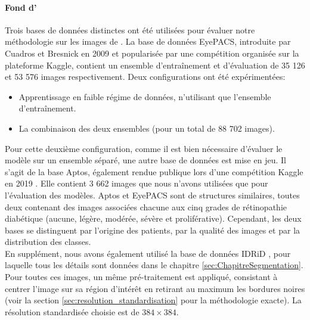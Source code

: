 \paragraph{Fond d'\oeil} Trois bases de données distinctes ont été utilisées pour évaluer notre méthodologie sur les images de \fundus. La base de données EyePACS, introduite par Cuadros et Bresnick en 2009 \cite{cuadros_bresnick_2009} et popularisée par une compétition organisée sur la plateforme Kaggle, contient un ensemble d'entraînement et d'évaluation de 35 126 et 53 576 images respectivement. Deux configurations ont été expérimentées: 
\begin{itemize}
	\item Apprentissage en faible régime de données, n'utilisant que l'ensemble d'entraînement.
	\item La combinaison des deux ensembles (pour un total de 88 702 images).
\end{itemize}
Pour cette deuxième configuration, comme il est bien nécessaire d'évaluer le modèle sur un ensemble séparé, une autre base de données est mise en jeu. Il s'agit de la base Aptos, également rendue publique lors d'une compétition Kaggle en 2019 \cite{APTOS2019Blindness2019}. Elle contient 3 662 images que nous n'avons utilisées que pour l'évaluation des modèles. Aptos et EyePACS sont de structures similaires, toutes deux contenant des images associées chacune aux cinq grades de rétinopathie diabétique (aucune, légère, modérée, sévère et proliférative). Cependant, les deux bases se distinguent par l'origine des patients, par la qualité des images et par la distribution des classes. \\
En supplément, nous avons également utilisé la base de données \ac{IDRiD} \cite{porwalIDRiDDiabeticRetinopathy2020}, pour laquelle tous les détails sont données dans le chapitre \ref{sec:ChapitreSegmentation}. Pour toutes ces images, un même pré-traitement est appliqué, consistant à centrer l'image sur sa région d'intérêt en retirant au maximum les bordures noires (voir la section \ref{sec:resolution_standardisation} pour la méthodologie exacte). La résolution standardisée choisie est de $384 \times 384$.

